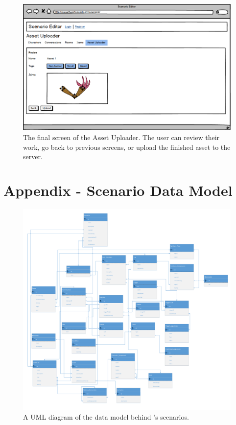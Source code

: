 \begin{figure}[H]
\centering\includegraphics[width=0.95\linewidth, height=0.7\paperheight, keepaspectratio=true]{images/AssetUploader_Arm5}
  \caption{The final screen of the Asset Uploader. The user can review their work, go back to previous screens, or upload the finished asset to the server.}
  \label{fig:mockup_asset_5}
\end{figure}


\chapter{Appendix - Scenario Data Model}
\label{app:DataModel}
\begin{figure}[H]
\centering\includegraphics[width=0.95\linewidth, height=0.75\paperheight, keepaspectratio=true]{DataModel}
  \caption{A UML diagram of the data model behind \ourgame{}'s scenarios.}
  \label{fig:UML}
\end{figure}


